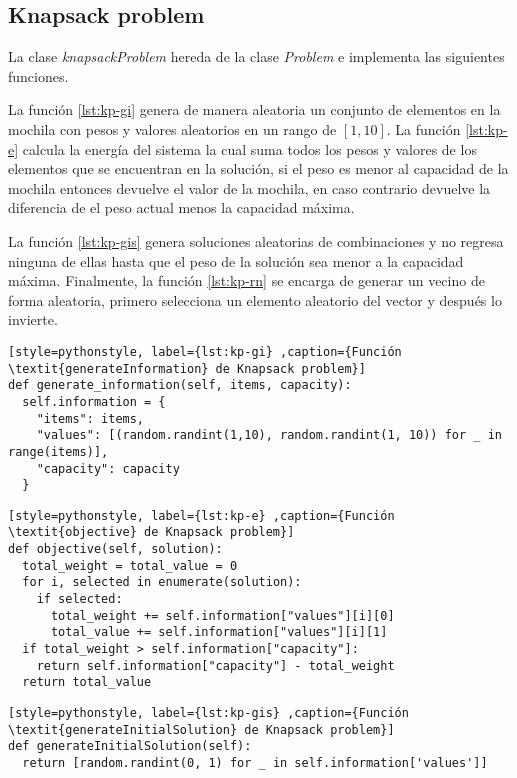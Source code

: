 \subsection{Knapsack problem}

La clase \textit{knapsackProblem} hereda de la clase \textit{Problem} e implementa las siguientes funciones.

La función \ref{lst:kp-gi} genera de manera aleatoria un conjunto de elementos en la mochila con pesos y valores aleatorios en un rango de $[1,10]$. La función \ref{lst:kp-e} calcula la energía del sistema la cual suma todos los pesos y valores de los elementos que se encuentran en la solución, si el peso es menor al capacidad de la mochila entonces devuelve el valor de la mochila, en caso contrario devuelve la diferencia de el peso actual menos la capacidad máxima.

La función \ref{lst:kp-gis} genera soluciones aleatorias de combinaciones y no regresa ninguna de ellas hasta que el peso de la solución sea menor a la capacidad máxima. Finalmente, la función \ref{lst:kp-rn} se encarga de generar un vecino de forma aleatoria, primero selecciona un elemento aleatorio del vector y después lo invierte.  

\begin{lstlisting}[style=pythonstyle, label={lst:kp-gi} ,caption={Función \textit{generateInformation} de Knapsack problem}]
def generate_information(self, items, capacity):
  self.information = {
	"items": items,
	"values": [(random.randint(1,10), random.randint(1, 10)) for _ in range(items)],
	"capacity": capacity
  }
\end{lstlisting}

\begin{lstlisting}[style=pythonstyle, label={lst:kp-e} ,caption={Función \textit{objective} de Knapsack problem}]
def objective(self, solution):
  total_weight = total_value = 0
  for i, selected in enumerate(solution):
    if selected:
      total_weight += self.information["values"][i][0]
  	  total_value += self.information["values"][i][1]
  if total_weight > self.information["capacity"]:
    return self.information["capacity"] - total_weight 
  return total_value
\end{lstlisting}

\begin{lstlisting}[style=pythonstyle, label={lst:kp-gis} ,caption={Función \textit{generateInitialSolution} de Knapsack problem}]
def generateInitialSolution(self):
  return [random.randint(0, 1) for _ in self.information['values']]
\end{lstlisting}

